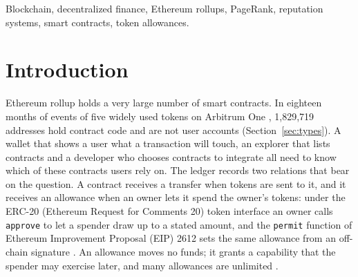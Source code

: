 \documentclass{ieeeaccess}
\begin{document}
\begin{keywords}
Blockchain, decentralized finance, Ethereum rollups, PageRank, reputation systems, smart contracts, token allowances.
\end{keywords}

\titlepgskip=-21pt

\maketitle

\section{Introduction}
\label{sec:intro}

 Ethereum rollup holds a very large number of smart contracts. In eighteen months of events of five widely used tokens on Arbitrum One \cite{kalodner2018arbitrum}, 1,829,719 addresses hold contract code and are not user accounts (Section~\ref{sec:types}). A wallet that shows a user what a transaction will touch, an explorer that lists contracts and a developer who chooses contracts to integrate all need to know which of these contracts users rely on. The ledger records two relations that bear on the question. A contract receives a transfer when tokens are sent to it, and it receives an allowance when an owner lets it spend the owner's tokens: under the ERC-20 (Ethereum Request for Comments 20) token interface an owner calls \texttt{approve} to let a spender draw up to a stated amount, and the \texttt{permit} function of Ethereum Improvement Proposal (EIP) 2612 sets the same allowance from an off-chain signature \cite{vogelsteller2015erc20,lundfall2020permit}. An allowance moves no funds; it grants a capability that the spender may exercise later, and many allowances are unlimited \cite{wang2022unlimited}.
\end{document}
